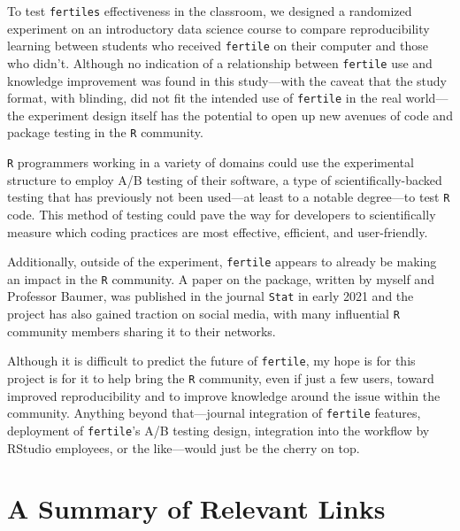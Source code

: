\documentclass[12pt,twoside]{reedthesis}
\begin{document}
To test \texttt{fertile\textquotesingle{}s} effectiveness in the classroom, we designed a randomized experiment on an introductory data science course to compare reproducibility learning between students who received \texttt{fertile} on their computer and those who didn't. Although no indication of a relationship between \texttt{fertile} use and knowledge improvement was found in this study---with the caveat that the study format, with blinding, did not fit the intended use of \texttt{fertile} in the real world---the experiment design itself has the potential to open up new avenues of code and package testing in the \texttt{R} community.

\texttt{R} programmers working in a variety of domains could use the experimental structure to employ A/B testing of their software, a type of scientifically-backed testing that has previously not been used---at least to a notable degree---to test \texttt{R} code. This method of testing could pave the way for developers to scientifically measure which coding practices are most effective, efficient, and user-friendly.

Additionally, outside of the experiment, \texttt{fertile} appears to already be making an impact in the \texttt{R} community. A paper on the package, written by myself and Professor Baumer, was published in the journal \texttt{Stat} in early 2021 and the project has also gained traction on social media, with many influential \texttt{R} community members sharing it to their networks.

Although it is difficult to predict the future of \texttt{fertile}, my hope is for this project is for it to help bring the \texttt{R} community, even if just a few users, toward improved reproducibility and to improve knowledge around the issue within the community. Anything beyond that---journal integration of \texttt{fertile} features, deployment of \texttt{fertile}'s A/B testing design, integration into the workflow by RStudio employees, or the like---would just be the cherry on top.

\appendix

\hypertarget{a-summary-of-relevant-links}{%
\chapter{A Summary of Relevant Links}\label{a-summary-of-relevant-links}}
\end{document}
